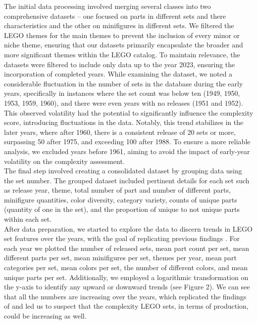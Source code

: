 \documentclass{article}
\theoremstyle{plain}
\theoremstyle{definition}
\theoremstyle{remark}
\begin{document}
The initial data processing involved merging several classes into two comprehensive datasets – one focused on parts in different sets and there characteristics and the other on minifigures in different sets. We filtered the LEGO themes for the main themes to prevent the inclusion of every minor or niche theme, ensuring that our datasets primarily encapsulate the broader and more significant themes within the LEGO catalog. To maintain relevance, the datasets were filtered to include only data up to the year 2023, ensuring the incorporation of completed years. While examining the dataset, we noted a considerable fluctuation in the number of sets in the database during the early years, specifically in instances where the set count was below ten (1949, 1950, 1953, 1959, 1960), and there were even years with no releases (1951 and 1952). This observed volatility had the potential to significantly influence the complexity score, introducing fluctuations in the data. Notably, this trend stabilizes in the later years, where after 1960, there is a consistent release of 20 sets or more, surpassing 50 after 1975, and exceeding 100 after 1988. To ensure a more reliable analysis, we excluded years before 1961, aiming to avoid the impact of early-year volatility on the complexity assessment. \\
The final step involved creating a consolidated dataset by grouping data using the set number. The grouped dataset included pertinent details for each set such as release year, theme, total number of part and number of different parts, minifigure quantities, color diversity, category variety, counts of unique parts (quantity of one in the set), and the proportion of unique to not unique parts within each set.\\
After data preparation, we started to explore the data to discern trends in LEGO set features over the years, with the goal of replicating previous findings \cite{legocomplexity}. For each year we plotted the number of released sets, mean part count per set, mean different parts per set, mean minifigures per set, themes per year, mean part categories per set, mean colors per set, the number of different colors, and mean unique parts per set. Additionally, we employed a logarithmic transformation on the y-axis to identify any upward or downward trends (see Figure 2). We can see that all the numbers are increasing over the years, which replicated the findings of \citet{legocomplexity} and led us to suspect that the complexity LEGO sets, in terms of production, could be increasing as well.\\
\end{document}
